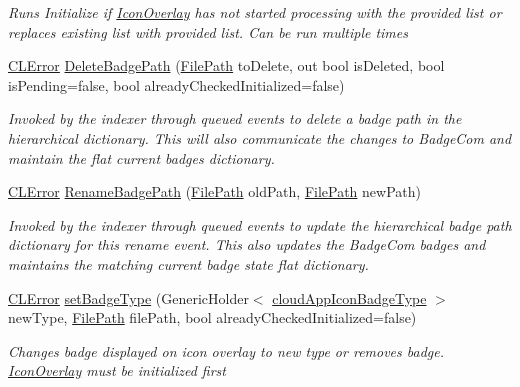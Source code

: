 \begin{DoxyCompactItemize}
\begin{DoxyCompactList}\small\item\em Runs Initialize if \hyperlink{class_cloud_api_public_1_1_badge_n_e_t_1_1_icon_overlay}{Icon\-Overlay} has not started processing with the provided list or replaces existing list with provided list. Can be run multiple times \end{DoxyCompactList}\item 
\hyperlink{class_cloud_api_public_1_1_model_1_1_c_l_error}{C\-L\-Error} \hyperlink{class_cloud_api_public_1_1_badge_n_e_t_1_1_icon_overlay_ac996129efd6ab91fffec1ffa5dedda43}{Delete\-Badge\-Path} (\hyperlink{class_cloud_api_public_1_1_model_1_1_file_path}{File\-Path} to\-Delete, out bool is\-Deleted, bool is\-Pending=false, bool already\-Checked\-Initialized=false)
\begin{DoxyCompactList}\small\item\em Invoked by the indexer through queued events to delete a badge path in the hierarchical dictionary. This will also communicate the changes to Badge\-Com and maintain the flat current badges dictionary. \end{DoxyCompactList}\item 
\hyperlink{class_cloud_api_public_1_1_model_1_1_c_l_error}{C\-L\-Error} \hyperlink{class_cloud_api_public_1_1_badge_n_e_t_1_1_icon_overlay_ab784cfe1e4fd0d572df4b4e8e2474f13}{Rename\-Badge\-Path} (\hyperlink{class_cloud_api_public_1_1_model_1_1_file_path}{File\-Path} old\-Path, \hyperlink{class_cloud_api_public_1_1_model_1_1_file_path}{File\-Path} new\-Path)
\begin{DoxyCompactList}\small\item\em Invoked by the indexer through queued events to update the hierarchical badge path dictionary for this rename event. This also updates the Badge\-Com badges and maintains the matching current badge state flat dictionary. \end{DoxyCompactList}\item 
\hyperlink{class_cloud_api_public_1_1_model_1_1_c_l_error}{C\-L\-Error} \hyperlink{class_cloud_api_public_1_1_badge_n_e_t_1_1_icon_overlay_ad22dfa8052149d6ca3c155dba33fd994}{set\-Badge\-Type} (Generic\-Holder$<$ \hyperlink{namespace_cloud_api_public_1_1_badge_n_e_t_afab91a750338fef6bd4ef08f5381c4e4}{cloud\-App\-Icon\-Badge\-Type} $>$ new\-Type, \hyperlink{class_cloud_api_public_1_1_model_1_1_file_path}{File\-Path} file\-Path, bool already\-Checked\-Initialized=false)
\begin{DoxyCompactList}\small\item\em Changes badge displayed on icon overlay to new type or removes badge. \hyperlink{class_cloud_api_public_1_1_badge_n_e_t_1_1_icon_overlay}{Icon\-Overlay} must be initialized first \end{DoxyCompactList}\item 

\end{DoxyCompactItemize}
